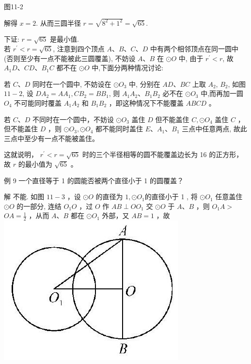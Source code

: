 \documentclass[10pt]{article}
\begin{document}
图11-2

解得 $x=2$. 从而三圆半径 $r=\sqrt{8^{2}+1^{2}}=\sqrt{65}$.

下证: $r=\sqrt{65}$ 是最小值.\\
若 $r^{\prime}<r=\sqrt{65}$, 注意到四个顶点 $A 、 B 、 C 、 D$ 中有两个相邻顶点在同一圆中 (否则至少有一点不能被此三圆覆盖), 不妨设 $A 、 B$ 在 $\odot O$ 中, 由于 $r^{\prime}<r$, 故 $A_{1} D 、 C D 、 B_{1} C$ 都不在 $\odot O$ 中,下面分两种情况讨论:

若 $C 、 D$ 同时在一个圆中, 不妨设在 $\odot O_{3}$ 中, 分别在 $A D 、 B C$ 上取 $A_{2}$, $B_{2}$, 如图 $11-2$, 设 $D A_{2}=A A_{1}, C B_{2}=B B_{1}$, 则 $A_{1} A_{2} 、 B_{1} B_{2}$ 必不在 $\odot O_{3}$ 中,而再加一圆 $O_{4}$ 不可能同时覆盖 $A_{1} A_{2}$ 和 $B_{1} B_{2}$ ，即这种情况下不能覆盖 $A B C D$ 。

若 $C 、 D$ 不同时在一个圆中，不妨设 $\odot O_{3}$ 盖住 $D$ 但不能盖住 $C, \odot O_{4}$ 盖住 $C$ ，但不能盖住 $D$ ，则 $\odot O_{3}, \odot O_{4}$ 都不能同时盖住 $E 、 A_{1} 、 B_{1}$ 三点中任意两点, 故此三点中至少有一点不能被盖住。

这就说明， $r^{\prime}<r=\sqrt{65}$ 时的三个半径相等的圆不能覆盖边长为 16 的正方形，故 $r$ 的最小值为 $\sqrt{65}$ 。

例 9 一个直径等于 1 的圆能否被两个直径小于 1 的圆覆盖？

解 不能. 如图 $11-3$ ，设 $\odot O$ 的直径为 $1, \odot O_{1}$的直径小于 1 , 将 $\odot O_{1}$ 任意盖住 $\odot O$ 的一部分, 连结 $O_{1} O$ ，过 $O$ 作 $A B \perp O O_{1}$ 交 $\odot O$ 于 $A 、 B$ ，则 $O_{1} A>$ $O A=\frac{1}{2}$ ，从而 $A 、 B$ 都在 $\odot O_{1}$ 外部，又 $A B=1$ ，故\\
\includegraphics[max width=\textwidth, center]{2024_10_30_66b8e5e701da2093c133g-083}
\end{document}
